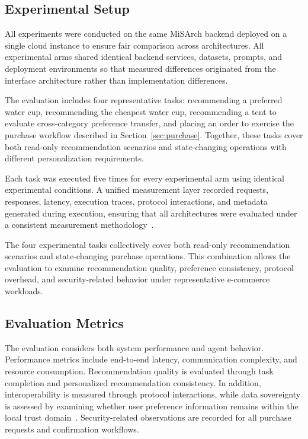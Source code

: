 \documentclass[conference]{IEEEtran}
\begin{document}
\subsection{Experimental Setup}

All experiments were conducted on the same MiSArch backend deployed on a
single cloud instance to ensure fair comparison across architectures. All
experimental arms shared identical backend services, datasets, prompts, and
deployment environments so that measured differences originated from the
interface architecture rather than implementation differences.

The evaluation includes four representative tasks: recommending a preferred
water cup, recommending the cheapest water cup, recommending a tent to
evaluate cross-category preference transfer, and placing an order to
exercise the purchase workflow described in
Section~\ref{sec:purchase}. Together, these tasks cover both read-only
recommendation scenarios and state-changing operations with different
personalization requirements.

Each task was executed five times for every experimental arm using identical
experimental conditions. A unified measurement layer recorded requests,
responses, latency, execution traces, protocol interactions, and metadata
generated during execution, ensuring that all architectures were evaluated
under a consistent measurement methodology~\cite{ref2,ref3}.

The four experimental tasks collectively cover both read-only recommendation
scenarios and state-changing purchase operations. This combination allows
the evaluation to examine recommendation quality, preference consistency,
protocol overhead, and security-related behavior under representative
e-commerce workloads.

\subsection{Evaluation Metrics}

The evaluation considers both system performance and agent behavior.
Performance metrics include end-to-end latency, communication complexity, and
resource consumption. Recommendation quality is evaluated through task
completion and personalized recommendation consistency. In addition,
interoperability is measured through protocol interactions, while data
sovereignty is assessed by examining whether user preference information
remains within the local trust domain~\cite{ref3}. Security-related
observations are recorded for all purchase requests and confirmation
workflows.
\end{document}
